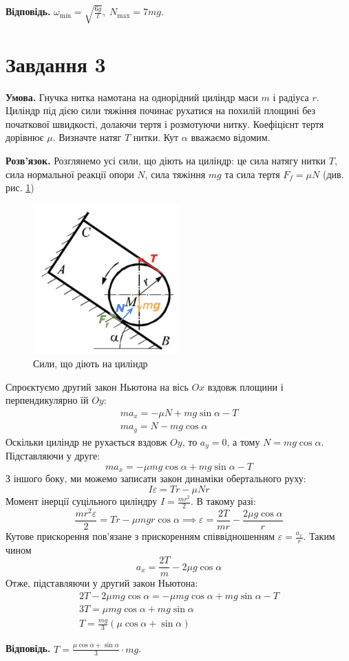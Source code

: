\documentclass[14pt]{extarticle}
\begin{document}
\textbf{Відповідь.} $\omega_{\min}=\sqrt{\frac{6g}{\ell}}, \; N_{\max}=7mg$.

\pagebreak
\section*{Завдання 3}

\textbf{Умова.} Гнучка нитка намотана на однорідний циліндр маси $m$ і радіуса $r$. Циліндр під дією сили тяжіння починає рухатися на похилій площині без початкової швидкості, долаючи тертя і розмотуючи нитку. Коефіцієнт тертя
дорівнює $\mu$. Визначте натяг $T$ нитки. Кут $\alpha$ вважаємо відомим.

\textbf{Розв'язок.} Розглянемо усі сили, що діють на циліндр: це сила натягу нитки $T$, сила нормальної реакції опори $N$, сила тяжіння $mg$ та сила тертя $F_f=\mu N$ (див. рис. \ref{fig:2})

\begin{figure}[H]
    \centering
    \includegraphics[width=0.5\textwidth]{images/test_2/problem_3.png}
    \caption{Сили, що діють на циліндр}
    \label{fig:2}
\end{figure}

Спроєктуємо другий закон Ньютона на вісь $Ox$ вздовж площини і перпендикулярно їй $Oy$:
\begin{gather*}
ma_x = -\mu N + mg \sin\alpha - T \\ 
ma_y = N - mg\cos\alpha 
\end{gather*}
Оскільки циліндр не рухається вздовж $Oy$, то $a_y=0$, а тому $N=mg\cos\alpha$. Підставляючи у друге:
\[
ma_x = -\mu mg \cos\alpha + mg\sin\alpha - T
\]
З іншого боку, ми можемо записати закон динаміки обертального руху:
\[
I\varepsilon = Tr - \mu N r
\]
Момент інерції суцільного циліндру $I = \frac{mr^2}{2}$. В такому разі:
\[
\frac{mr^2\varepsilon}{2} = Tr - \mu mgr \cos\alpha \implies \varepsilon = \frac{2T}{mr} - \frac{2\mu g \cos\alpha }{r}
\]
Кутове прискорення пов'язане з прискоренням співвідношенням $\varepsilon = \frac{a_x}{r}$. Таким чином
\[
a_x = \frac{2T}{m} - 2\mu g \cos\alpha
\]
Отже, підставляючи у другий закон Ньютона:
\begin{gather*}
2T - 2\mu mg \cos\alpha = -\mu mg \cos\alpha + mg \sin \alpha - T \\
3T = \mu mg \cos\alpha + mg\sin \alpha \\
\boxed{T = \frac{mg}{3}(\mu \cos\alpha + \sin \alpha)}
\end{gather*}

\textbf{Відповідь.} $T=\frac{\mu \cos\alpha+\sin\alpha}{3}\cdot mg$.
\end{document}
